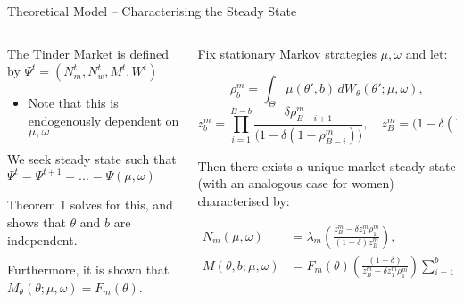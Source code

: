 \documentclass[10pt, aspectratio=169,xcolor=dvipsnames]{beamer}
\makeatletter
\newenvironment{myitemize}{%
   \setlength{\topsep}{0pt}
   \setlength{\partopsep}{0pt}
   \itemize
}{\enditemize}
\makeatother
\begin{document}

\begin{frame}{Theoretical Model – Characterising the Steady State}
\begin{columns}
\begin{column}{0.45\textwidth}
\begin{myitemize}
\setlength\itemsep{1em} 
    \item The Tinder Market is defined by $\Psi^t=(N_m^t, N_w^t, M^t, W^t)$ 
    \begin{itemize}
        \item Note that this is endogenously dependent on $\mu,\omega$
    \end{itemize}
    \item We seek steady state such that $\Psi^t=\Psi^{t+1}=...=\Psi(\mu,\omega)$
    \item Theorem 1 solves for this, and shows that $\theta$ and $b$ are independent.
    \item Furthermore, it is shown that $M_\theta(\theta;\mu,\omega)= F_m(\theta)$.
    
\end{myitemize}
\end{column}

\begin{column}{0.55\textwidth}
    \begin{theorem}
    \small
    
    Fix stationary Markov strategies $\mu,\omega$ and let:
    
    \begin{equation*}
    \rho^m_b=\int_{\Theta}  \mu(\theta',b)\,dW_\theta(\theta';\mu,\omega),
    \end{equation*} 
    \begin{equation*} 
    z^m_b = \prod^{B-b}_{i=1} \frac{\delta\rho^m_{B-i+1}}{\Big(1-\delta (1-\rho^m_{B-i}) \Big)},\quad z^m_B=\Big(1-\delta (1-\rho^m_B)\Big)
    \end{equation*}  
    \par\vspace{0.2cm}
    Then there exists a unique market steady state (with an analogous case for women) characterised by: 
    \par\vspace{0.2cm}
    \begin{equation*} \begin{aligned}N_m(\mu,\omega)&=\lambda_m\left(\frac{z^m_B-\delta z^m_1\rho^m_1}{(1-\delta)z^m_B}\right), \\ M(\theta,b;\mu,\omega)&=F_m(\theta) \left(\frac{(1-\delta)}{z^m_B-\delta z^m_1\rho^m_1}\right)\sum^b_{i=1} z^m_i 
    \end{aligned}
    \end{equation*} 
    \end{theorem} 
\end{column}
\end{columns}
\end{frame} 
\end{document}
